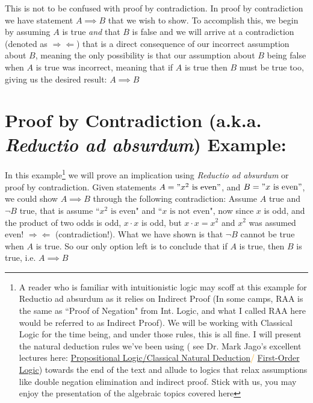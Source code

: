\noindent This is not to be confused with proof by contradiction. In proof by contradiction we have statement $A\implies B$ that we wish to show. To accomplish this, we begin by assuming $A$ is true \textit{and} that $B$ is false and we will arrive at a contradiction (denoted as $\Rightarrow\Leftarrow$) that is a direct consequence of our incorrect assumption about $B$, meaning the only possibility is that our assumption about $B$ being false when $A$ is true was incorrect, meaning that if $A$ is true then $B$ must be true too, giving us the desired result: $A \implies B$ 
\newpage
\noindent\section{Proof by Contradiction (a.k.a. 
\textit{Reductio ad absurdum}) Example:} In this example\footnote{ A reader who is familiar with intuitionistic logic may scoff at this example for Reductio ad absurdum as it relies on Indirect Proof (In some camps, RAA is the same as ``Proof of Negation" from Int. Logic, and what I called RAA here would be referred to as Indirect Proof). We will be working with Classical Logic for the time being, and under those rules, this is all fine. I will present the natural deduction rules we've been using ( see Dr. Mark Jago's excellent lectures here: \textcolor{orange}{\href{https://www.youtube.com/watch?v=dlUkeN7KqVA&t=8s}{Propositional Logic/Classical Natural Deduction}/ \href{https://www.youtube.com/watch?v=C30w5vZypXE}{First-Order Logic}}) towards the end of the text and allude to logics that relax assumptions like double negation elimination and indirect proof. Stick with us, you may enjoy the presentation of the algebraic topics covered here \smiley } we will prove an implication using \textit{Reductio ad absurdum} or proof by contradiction. Given statements $A= "x^2 \text{ is even}"$, and $B= "x \text{ is even}"$, we could show $A\implies B$ through the following contradiction: Assume $A$ true and $\lnot B$ true, that is assume ``$x^2 \text{ is even}$" and ``$x \text{ is not even}$", now since $x$ is odd, and the product of two odds is odd, $x\cdot x$ is odd, but $x\cdot x=x^2$ and $x^2$ was assumed even! $\Rightarrow\Leftarrow$ (contradiction!). What we have shown is that $\lnot B$ cannot be true when $A$ is true. So our only option left is to conclude that if $A$ is true, then $B$ is true, i.e. $A\implies B$

